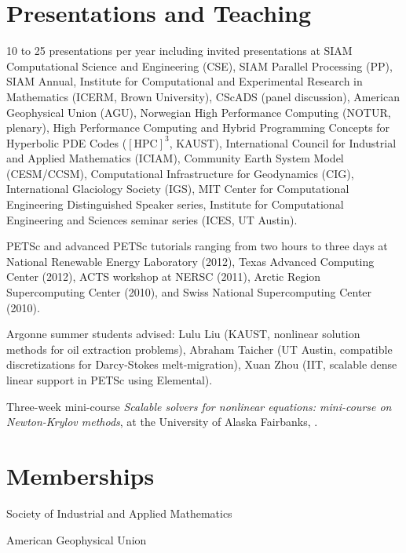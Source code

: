 \documentclass[10pt,letterpaper]{article}
\renewenvironment{itemize}{
  \begin{list}{}{
    \setlength{\leftmargin}{1.5em}
    \setlength{\itemsep}{0.25em}
    \setlength{\parskip}{0pt}
    \setlength{\parsep}{0.25em}
  }
}{
  \end{list}
}
\begin{document}
\section*{Presentations and Teaching}
\begin{itemize}
\item 10 to 25 presentations per year including invited presentations at SIAM Computational Science and Engineering (CSE), SIAM Parallel Processing (PP), SIAM Annual, Institute for Computational and Experimental Research in Mathematics (ICERM, Brown University), CScADS (panel discussion), American Geophysical Union (AGU), Norwegian High Performance Computing (NOTUR, plenary), High Performance Computing and Hybrid Programming Concepts for Hyperbolic PDE Codes ($[\text{HPC}]^3$, KAUST),  International Council for Industrial and Applied Mathematics (ICIAM), Community Earth System Model (CESM/CCSM), Computational Infrastructure for Geodynamics (CIG), International Glaciology Society (IGS), MIT Center for Computational Engineering Distinguished Speaker series, Institute for Computational Engineering and Sciences seminar series (ICES, UT Austin).
\item PETSc and advanced PETSc tutorials ranging from two hours to three days at National Renewable Energy Laboratory (2012), Texas Advanced Computing Center (2012), ACTS workshop at NERSC (2011), Arctic Region Supercomputing Center (2010), and Swiss National Supercomputing Center (2010).
\item Argonne summer students advised: Lulu Liu (KAUST, nonlinear solution methods for oil extraction problems), Abraham Taicher (UT Austin, compatible discretizations for Darcy-Stokes melt-migration), Xuan Zhou (IIT, scalable dense linear support in PETSc using Elemental).
\item Three-week mini-course \emph{Scalable solvers for nonlinear equations: mini-course on Newton-Krylov methods}, at the University of Alaska Fairbanks, .
\end{itemize}

\section*{Memberships}
\begin{itemize}
\item Society of Industrial and Applied Mathematics
\item American Geophysical Union
\end{itemize}
\end{document}
